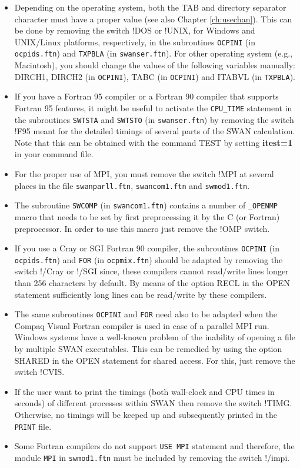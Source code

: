 \documentclass[12pt]{book}
\begin{document}
\begin{itemize}
  \item[{\tt -dos}, {\tt -unix}]
  Depending on the operating system, both the TAB and directory separator character must
  have a proper value (see also Chapter \ref{ch:usechan}). This can be done by removing
  the switch !DOS or !UNIX, for Windows and UNIX/Linux platforms, respectively, in the
  subroutines {\tt OCPINI} (in {\tt ocpids.ftn}) and {\tt TXPBLA} (in {\tt swanser.ftn}).
  For other operating system (e.g., Macintosh), you should change the values of the following
  variables manually: {\scriptsize DIRCH1}, {\scriptsize DIRCH2} (in {\tt OCPINI}),
  {\scriptsize TABC} (in {\tt OCPINI}) and {\scriptsize ITABVL} (in {\tt TXPBLA}).
  \item[{\tt -f95}]
  If you have a Fortran 95 compiler or a Fortran 90 compiler that supports Fortran 95
  features, it might be useful to activate the {\tt CPU\_TIME} statement in the subroutines
  {\tt SWTSTA} and {\tt SWTSTO} (in {\tt swanser.ftn}) by removing the switch !F95 meant for
  the detailed timings of several parts of the SWAN calculation. Note that this can be
  obtained with the command TEST by setting {\bf itest=1} in your command file.
  \item[{\tt -mpi}]
  For the proper use of MPI, you must remove the switch !MPI at several places in the file
  {\tt swanparll.ftn}, {\tt swancom1.ftn} and {\tt swmod1.ftn}.
  \item[{\tt -omp}]
  The subroutine {\tt SWCOMP} (in {\tt swancom1.ftn}) contains a number of {\tt \_OPENMP}
  macro that needs to be set by first preprocessing it by the C (or Fortran) preprocessor.
  In order to use this macro just remove the !OMP switch.
  \item[{\tt -cray}, {\tt -sgi}]
  If you use a Cray or SGI Fortran 90 compiler, the subroutines {\tt OCPINI} (in {\tt ocpids.ftn})
  and {\tt FOR} (in {\tt ocpmix.ftn}) should be adapted by removing the switch !/Cray or !/SGI since,
  these compilers cannot read/write lines longer than 256 characters by default. By means
  of the option {\scriptsize RECL} in the OPEN statement sufficiently long lines can be
  read/write by these compilers.
  \item[{\tt -cvis}]
  The same subroutines {\tt OCPINI} and {\tt FOR} need also to be adapted when the Compaq Visual
  Fortran compiler is used in case of a parallel MPI run. Windows systems have a well-known problem
  of the inability of opening a file by multiple SWAN executables. This can be remedied by using the
  option {\scriptsize SHARED} in the OPEN statement for shared access. For this, just remove the
  switch !CVIS.
  \item[{\tt -timg}]
  If the user want to print the timings (both wall-clock and CPU times in seconds) of different
  processes within SWAN then remove the switch !TIMG. Otherwise, no timings will be keeped up
  and subsequently printed in the {\tt PRINT} file.
  \item[{\tt -impi}]
  Some Fortran compilers do not support {\tt USE MPI} statement and therefore,
  the module {\tt MPI} in {\tt swmod1.ftn} must be included by removing the switch !/impi.
\end{itemize}
\end{document}

